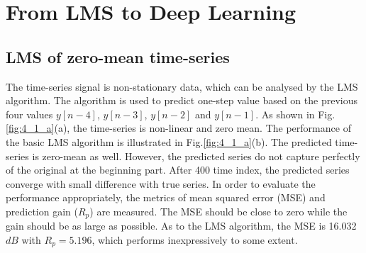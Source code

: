 \chapter{From LMS to Deep Learning}
\section{LMS of zero-mean time-series}
The time-series signal is non-stationary data, which can be analysed by the LMS algorithm. The algorithm is used to predict one-step value based on the previous four values $y[n-4]$, $y[n-3]$, $y[n-2]$ and $y[n-1]$. As shown in Fig.\ref{fig:4_1_a}(a), the time-series is non-linear and zero mean. The performance of the basic LMS algorithm is illustrated in Fig.\ref{fig:4_1_a}(b). The predicted time-series is zero-mean as well. However, the predicted series do not capture perfectly of the original at the beginning part. After 400 time index, the predicted series converge with small difference with true series. In order to evaluate the performance appropriately, the metrics of mean squared error (MSE) and prediction gain ($R_p$) are measured. The MSE should be close to zero while the gain should be as large as possible. As to the LMS algorithm, the MSE is 16.032$dB$ with $R_p=5.196$, which performs inexpressively to some extent.
